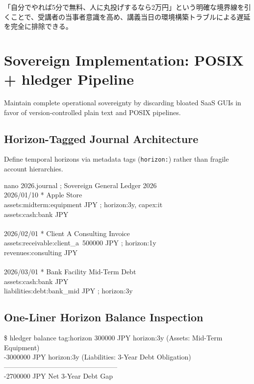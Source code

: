 「自分でやれば5分で無料、人に丸投げするなら2万円」という明確な境界線を引くことで、受講者の当事者意識を高め、講義当日の環境構築トラブルによる遅延を完全に排除できる。

\else
\chapter{Sovereign Implementation: POSIX + hledger Pipeline}
\label{chap:hledger_implementation}

Maintain complete operational sovereignty by discarding bloated SaaS GUIs in favor of version-controlled plain text and POSIX pipelines.

\section{Horizon-Tagged Journal Architecture}
Define temporal horizons via metadata tags (\texttt{horizon:}) rather than fragile account hierarchies.

\begin{terminalbox}{nano 2026.journal}
; Sovereign General Ledger 2026\\
2026/01/10 * Apple Store\\
\quad assets:midterm:equipment JPY \quad ; horizon:3y, capex:it\\
\quad assets:cash:bank\qquad\qquad{} JPY\\
\\
2026/02/01 * Client A Consulting Invoice\\
\quad assets:receivable:client\_a\quad\ 500000 JPY \quad ; horizon:1y\\
\quad revenues:consulting\qquad{} JPY\\
\\
2026/03/01 * Bank Facility Mid-Term Debt\\
\quad assets:cash:bank\qquad\qquad{} JPY\\
\quad liabilities:debt:bank\_mid JPY \quad ; horizon:3y
\end{terminalbox}

\section{One-Liner Horizon Balance Inspection}
\begin{terminalbox}{\$ hledger balance tag:horizon}
\phantom{-}300000 JPY \quad horizon:3y (Assets: Mid-Term Equipment)\\
-3000000 JPY \quad horizon:3y (Liabilities: 3-Year Debt Obligation)\\
--------------------------------------------------\\
-2700000 JPY \quad Net 3-Year Debt Gap
\end{terminalbox}

